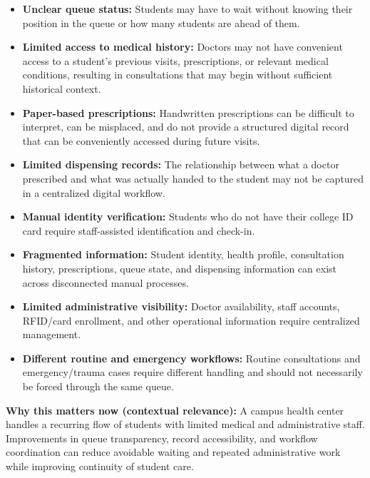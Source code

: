 \documentclass[11pt,a4paper]{article}
\begin{document}
\begin{itemize}

    \item \textbf{Unclear queue status:} Students may have to wait without knowing their position in the queue or how many students are ahead of them.

    \item \textbf{Limited access to medical history:} Doctors may not have convenient access to a student's previous visits, prescriptions, or relevant medical conditions, resulting in consultations that may begin without sufficient historical context.

    \item \textbf{Paper-based prescriptions:} Handwritten prescriptions can be difficult to interpret, can be misplaced, and do not provide a structured digital record that can be conveniently accessed during future visits.

    \item \textbf{Limited dispensing records:} The relationship between what a doctor prescribed and what was actually handed to the student may not be captured in a centralized digital workflow.

    \item \textbf{Manual identity verification:} Students who do not have their college ID card require staff-assisted identification and check-in.

    \item \textbf{Fragmented information:} Student identity, health profile, consultation history, prescriptions, queue state, and dispensing information can exist across disconnected manual processes.

    \item \textbf{Limited administrative visibility:} Doctor availability, staff accounts, RFID/card enrollment, and other operational information require centralized management.

    \item \textbf{Different routine and emergency workflows:} Routine consultations and emergency/trauma cases require different handling and should not necessarily be forced through the same queue.

\end{itemize}

\textbf{Why this matters now (contextual relevance):} A campus health center handles a recurring flow of students with limited medical and administrative staff. Improvements in queue transparency, record accessibility, and workflow coordination can reduce avoidable waiting and repeated administrative work while improving continuity of student care.
\end{document}
